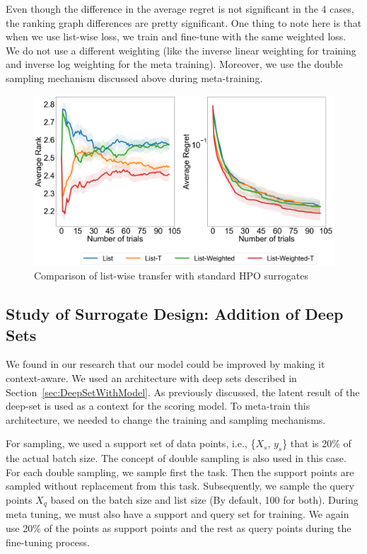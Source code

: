 \documentclass[12pt, twoside, ngerman]{report}
\begin{document}
Even though the difference in the average regret is not significant in the 4 cases,  the ranking graph differences are pretty significant. One thing to note here is that when we use list-wise loss,  we train and fine-tune with the same weighted loss. We do not use a different weighting (like the inverse linear weighting for training and inverse log weighting for the meta training). Moreover, we use the double sampling mechanism discussed above during meta-training.

\begin{figure}[h]
  \centering
    \includegraphics[scale=0.25]{images/Q2Ablation}
    \caption{Comparison of list-wise transfer with standard HPO surrogates}
    \label{fig:Q2Ablation}
\end{figure}


\subsection{Study of Surrogate Design: Addition of Deep Sets}

We found in our research that our model could be improved by making it context-aware. We used an architecture with deep sets described in Section~\ref{sec:DeepSetWithModel}. As previously discussed, the latent result of the deep-set is used as a context for the scoring model. To meta-train this architecture,  we needed to change the training and sampling mechanisms.

For sampling, we used a support set of data points, i.e., \{$X_s$, $y_s$\} that is 20\% of the actual batch size. The concept of double sampling is also used in this case. For each double sampling, we sample first the task.
Then the support points are sampled without replacement from this task.
Subsequently, we sample the query points $X_q$ based on the batch size and list size (By default, 100 for both).
During meta tuning, we must also have a support and query set for training.
We again use 20\% of the points as support points and the rest as query points during the fine-tuning process.
\end{document}
